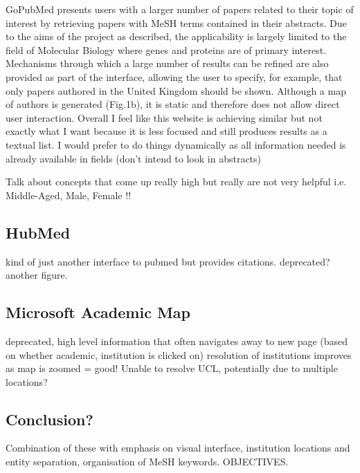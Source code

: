 \documentclass[PROP_AGutteridge_CS.tex]{subfiles}
\begin{document}
\noindent GoPubMed presents users with a larger number of papers related to their topic of interest by retrieving papers with MeSH terms contained in their abstracts. Due to the aims of the project as described\cite{doms}, the applicability is largely limited to the field of Molecular Biology where genes and proteins are of primary interest. Mechanisms through which a large number of results can be refined are also provided as part of the interface, allowing the user to specify, for example, that only papers authored in the United Kingdom should be shown. Although a map of authors is generated (Fig.1b), it is static and therefore does not allow direct user interaction. %
Overall I feel like this website is achieving similar but not exactly what I want because it is less focused and still produces results as a textual list. I would prefer to do things dynamically as all information needed is already available in fields (don't intend to look in abstracts)

Talk about concepts that come up really high but really are not very helpful i.e. Middle-Aged, Male, Female !!

\subsection{HubMed}
kind of just another interface to pubmed but provides citations. deprecated? another figure.

\subsection{Microsoft Academic Map}
deprecated, high level information that often navigates away to new page (based on whether academic, institution is clicked on) resolution of institutions improves as map is zoomed = good! Unable to resolve UCL, potentially due to multiple locations?

\subsection{Conclusion?}
Combination of these with emphasis on visual interface, institution locations and entity separation, organisation of MeSH keywords. OBJECTIVES.
\end{document}
